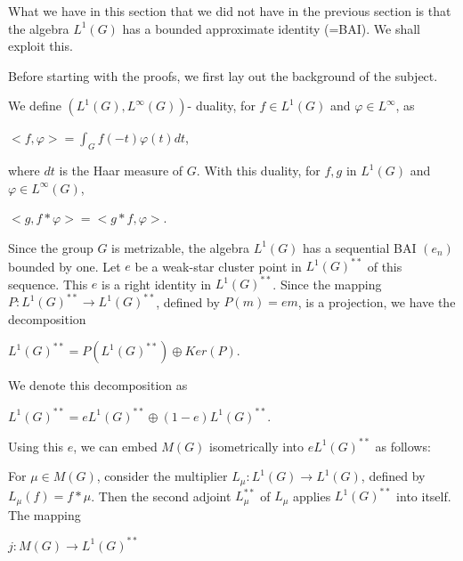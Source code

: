\documentclass[12pt, twoside, leqno]{article}
\theoremstyle{definition}
\theoremstyle{definition}
\numberwithin{equation}{section}
\begin{document}
What we have in this section that we did not have in the previous section is that the algebra $ L^{1}(G) $ has a bounded approximate identity (=BAI). We shall exploit this.\vspace{2mm}

Before starting with the proofs, we first lay out the background of the subject.\vspace{2mm}

 We define $ (L^{1}(G),L^{\infty}(G)) $- duality, for $ f\in L^{1}(G) $ and $ \varphi\in L^{\infty} $, as \vspace{3mm}
 
 $ <f,\varphi>=\int_{G}f(-t)\varphi(t)dt $,\vspace{3mm}
 
 \noindent where $ dt $ is the Haar measure of $ G $. With this duality, for $ f,g $ in $ L^{1}(G) $ and $ \varphi\in L^{\infty}(G) $,\vspace{3mm}
 
 $ <g,f*\varphi>=<g*f,\varphi> $.\vspace{3mm}

\noindent Since the group $ G $ is metrizable, the algebra $ L^{1}(G) $ has a sequential BAI $ (e_{n}) $ bounded by one. Let $ e $ be a weak-star cluster point in $ L^{1}(G) ^{**}$ of this sequence. This $ e $ is a right identity in $ L^{1}(G) ^{**}$. Since the mapping $ P:L^{1}(G)^{**}\rightarrow L^{1}(G)^{**} $, defined by $ P(m)=em $, is a projection, we have the decomposition\vspace{3mm}

$ L^{1}(G)^{**}=P(L^{1}(G)^{**})\oplus Ker(P) $.\vspace{3mm}

\noindent We denote this decomposition as\vspace{3mm}

$ L^{1}(G)^{**}=eL^{1}(G)^{**}\oplus(1-e)L^{1}(G)^{**} $.\vspace{3mm}

\noindent Using this $ e $, we can embed $ M(G) $ isometrically into $ eL^{1}(G)^{**} $ as follows:\vspace{2mm}

For $ \mu\in M(G) $, consider the multiplier $ L_{\mu}:L^{1}(G)\rightarrow L^{1}(G) $, defined by $ L_{\mu}(f)=f*\mu $. Then the second adjoint $ L_{\mu}^{**} $ of $ L_{\mu} $ applies $ L^{1}(G)^{**} $ into itself. The mapping \vspace{3mm}

$ j:M(G)\rightarrow  L^{1}(G)^{**} $\vspace{3mm}
\end{document}
